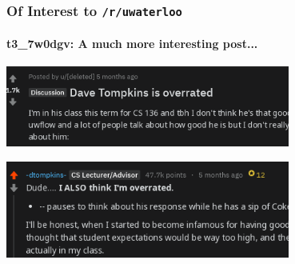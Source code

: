 \documentclass[frame number]{beamer}
\begin{document}
\begin{frame}[fragile]
  \frametitle{Of Interest to \texttt{/r/uwaterloo}}
  \framesubtitle{t3\_7w0dgv: A much more interesting post...}
  \begin{center}
    \includegraphics[width=0.7\textwidth]{figures/7w0dgv}
  \end{center}
  \pause
  \begin{center}
    \includegraphics[width=0.7\textwidth]{figures/davetompkins}
  \end{center}
\end{frame}
\end{document}
